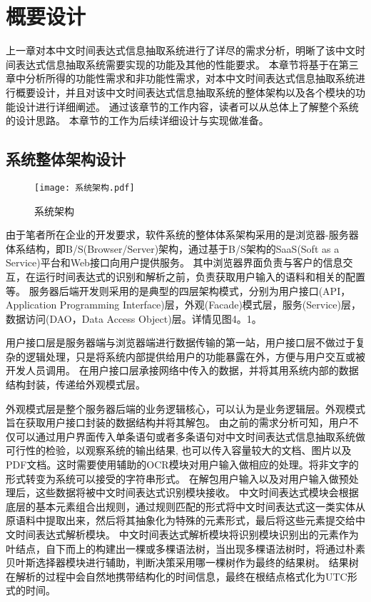 

\chapter{概要设计}

上一章对本中文时间表达式信息抽取系统进行了详尽的需求分析，明晰了该中文时间表达式信息抽取系统需要实现的功能及其他的性能要求。
本章节将基于在第三章中分析所得的功能性需求和非功能性需求，对本中文时间表达式信息抽取系统进行概要设计，并且对该中文时间表达式信息抽取系统的整体架构以及各个模块的功能设计进行详细阐述。
通过该章节的工作内容，读者可以从总体上了解整个系统的设计思路。
本章节的工作为后续详细设计与实现做准备。

\section{系统整体架构设计}

\begin{figure}[h]
  \centering
  \texttt{[image: 系统架构.pdf]}
  \caption{系统架构}
  \label{fig:architect}
\end{figure}

由于笔者所在企业的开发要求，软件系统的整体体系架构采用的是浏览器-服务器体系结构，即B/S(Browser/Server)架构，通过基于B/S架构的SaaS(Soft as a Service)平台和Web接口向用户提供服务。
其中浏览器界面负责与客户的信息交互，在运行时间表达式的识别和解析之前，负责获取用户输入的语料和相关的配置等。
服务器后端开发则采用的是典型的四层架构模式，分别为用户接口(API，Application Programming Interface)层，外观(Facade)模式层，服务(Service)层，数据访问(DAO，Data Access Object)层。详情见图4。1。

用户接口层是服务器端与浏览器端进行数据传输的第一站，用户接口层不做过于复杂的逻辑处理，只是将系统内部提供给用户的功能暴露在外，方便与用户交互或被开发人员调用。
在用户接口层承接网络中传入的数据，并将其用系统内部的数据结构封装，传递给外观模式层。

外观模式层是整个服务器后端的业务逻辑核心，可以认为是业务逻辑层。外观模式旨在获取用户接口封装的数据结构并将其解包。
由之前的需求分析可知，用户不仅可以通过用户界面传入单条语句或者多条语句对中文时间表达式信息抽取系统做可行性的检验，以观察系统的输出结果,
也可以传入容量较大的文档、图片以及PDF文档。这时需要使用辅助的OCR模块对用户输入做相应的处理。将非文字的形式转变为系统可以接受的字符串形式。
在解包用户输入以及对用户输入做预处理后，这些数据将被中文时间表达式识别模块接收。
中文时间表达式模块会根据底层的基本元素组合出规则，通过规则匹配的形式将中文时间表达式这一类实体从原语料中提取出来，然后将其抽象化为特殊的元素形式，最后将这些元素提交给中文时间表达式解析模块。
中文时间表达式解析模块将识别模块识别出的元素作为叶结点，自下而上的构建出一棵或多棵语法树，当出现多棵语法树时，将通过朴素贝叶斯选择器模块进行辅助，判断决策采用哪一棵树作为最终的结果树。
结果树在解析的过程中会自然地携带结构化的时间信息，最终在根结点格式化为UTC形式的时间。


